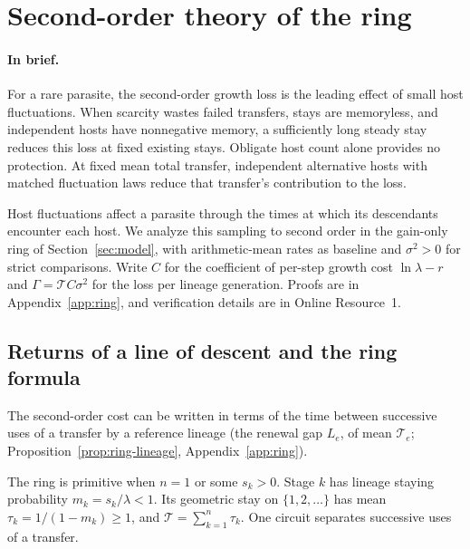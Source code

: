 \section{Second-order theory of the ring}\label{sec:ring}

\paragraph{In brief.}
For a rare parasite, the second-order growth loss is the leading effect of small host fluctuations. When scarcity wastes failed transfers, stays are memoryless, and independent hosts have nonnegative memory, a sufficiently long steady stay reduces this loss at fixed existing stays. Obligate host count alone provides no protection. At fixed mean total transfer, independent alternative hosts with matched fluctuation laws reduce that transfer's contribution to the loss.

Host fluctuations affect a parasite through the times at which its descendants encounter each host. We analyze this sampling to second order in the gain-only ring of Section~\ref{sec:model}, with arithmetic-mean rates as baseline and $\sigma^2 > 0$ for strict comparisons. Write $C$ for the coefficient of per-step growth cost $\ln\lambda-r$ and $\Gamma = \mathcal{T} C \sigma^2$ for the loss per lineage generation. Proofs are in Appendix~\ref{app:ring}, and verification details are in Online Resource~1.

\subsection{Returns of a line of descent and the ring formula}\label{subsec:ring-formula}

The second-order cost can be written in terms of the time between successive uses of a transfer by a reference lineage (the renewal gap $L_e$, of mean $\mathcal{T}_e$; Proposition~\ref{prop:ring-lineage}, Appendix~\ref{app:ring}).

The ring is primitive when $n = 1$ or some $s_k > 0$. Stage $k$ has lineage staying probability $m_k = s_k / \lambda < 1$. Its geometric stay on $\{1, 2, \dots\}$ has mean $\tau_k = 1/(1 - m_k) \ge 1$, and $\mathcal{T} = \sum_{k=1}^n \tau_k$. One circuit separates successive uses of a transfer.

